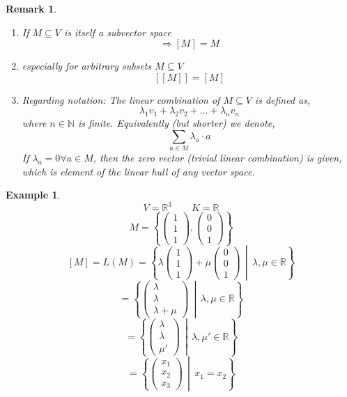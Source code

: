 \documentclass[a4paper,landscape,twocolumn]{article}
\newcommand\set[1]{\left\{#1\right\}}
\newcommand\setdef[2]{\left\{#1\,\middle|\,#2\right\}}
\newtheorem{ex}{Example}
\newtheorem{rem}{Remark}
\begin{document}
\begin{rem}
  \begin{enumerate}
    \item If $M \subseteq V$ is itself a subvector space
      \[ \Rightarrow [M] = M \]
    \item especially for arbitrary subsets $M \subseteq V$
      \[ \left[[M]\right] = [M] \]
    \item Regarding notation: The linear combination of $M \subseteq V$
      is defined as,
      \[ \lambda_1 v_1 + \lambda_2 v_2 + \ldots + \lambda_n v_n \]
      where $n \in \mathbb N$ is finite. Equivalently (but shorter) we denote,
      \[ \sum_{a \in M} \lambda_a \cdot a \]
      If $\lambda_a = 0 \forall a \in M$, then the zero vector
      (\emph{trivial} linear combination) is given, which is element of the linear hull
      of any vector space.
  \end{enumerate}
\end{rem}

\begin{ex}
  \[ V = \mathbb R^3 \qquad K = \mathbb R \]
  \[ M = \set{\begin{pmatrix} 1 \\ 1 \\ 1 \end{pmatrix}, \begin{pmatrix} 0 \\ 0 \\ 1 \end{pmatrix}} \]
  \[ [M] = L(M) = \setdef{\lambda \begin{pmatrix} 1 \\ 1 \\ 1\end{pmatrix} + \mu \begin{pmatrix} 0 \\ 0 \\ 1 \end{pmatrix}}{\lambda, \mu \in \mathbb R} \]
  \[ = \setdef{\begin{pmatrix} \lambda \\ \lambda \\ \lambda + \mu \end{pmatrix}}{\lambda, \mu \in \mathbb R} \]
  \[ = \setdef{\begin{pmatrix} \lambda \\ \lambda \\ \mu' \end{pmatrix}}{\lambda, \mu' \in \mathbb R} \]
  \[ = \setdef{\begin{pmatrix} x_1 \\ x_2 \\ x_3 \end{pmatrix}}{x_1 = x_2} \]
\end{ex}
\end{document}
